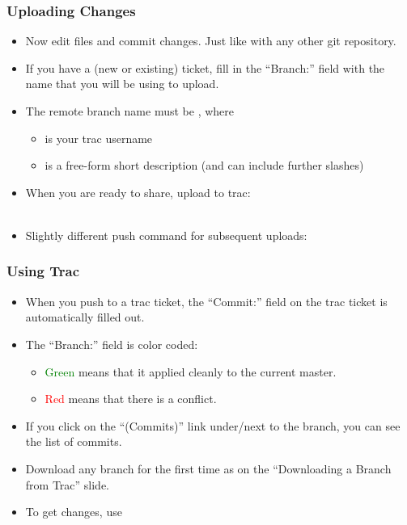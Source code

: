 \begin{frame}
  \frametitle{Uploading Changes}

  \begin{itemize}
  \item Now edit files and commit changes. Just like with any other git
    repository.
  \item If you have a (new or existing) ticket, fill in the
    ``Branch:'' field with the name that you will be using to upload.
  \item The remote branch name must be , where
    \begin{itemize}
    \item {} is your trac username
    \item {} is a free-form short description (and can
      include further slashes)
    \end{itemize}
  \item 
    When you are ready to share, upload to trac:\\
    \\
    \hspace{2cm}
  \item 
    Slightly different push command for subsequent uploads:\\
  \end{itemize}
\end{frame}



\begin{frame}
  \frametitle{Using Trac}

  \begin{itemize}
  \item When you push to a trac ticket, the ``Commit:'' field on the
    trac ticket is automatically filled out.
  \item The ``Branch:'' field is color coded:
    \begin{itemize}
    \item \textcolor{green}{Green} means that it applied cleanly to the current master.
    \item \textcolor{red}{Red} means that there is a conflict.
    \end{itemize}
  \item If you click on the ``(Commits)'' link under/next to the
    branch, you can see the list of commits.
  \item Download any branch for the first time as on the ``Downloading
    a Branch from Trac'' slide.
  \item To get changes, use 
  \end{itemize}
\end{frame}


